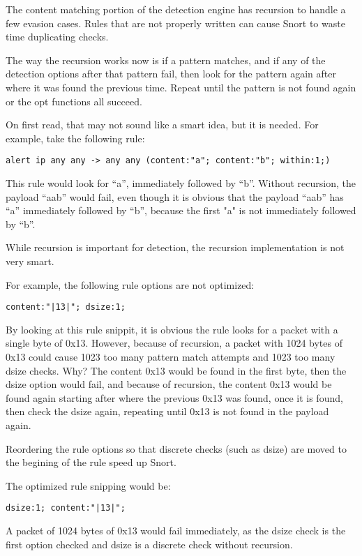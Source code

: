 \documentclass[english]{report}
\begin{document}
The content matching portion of the detection engine has recursion to handle a
few evasion cases.  Rules that are not properly written can cause Snort to
waste time duplicating checks.

The way the recursion works now is if a pattern matches, and if any of the
detection options after that pattern fail, then look for the pattern again
after where it was found the previous time.  Repeat until the pattern is not
found again or the opt functions all succeed.

On first read, that may not sound like a smart idea, but it is needed.  For example, take the following rule:

\begin{verbatim}
alert ip any any -> any any (content:"a"; content:"b"; within:1;)
\end{verbatim}

This rule would look for ``a'', immediately followed by ``b''.  Without recursion,
the payload ``aab'' would fail, even though it is obvious that the payload ``aab''
has ``a'' immediately followed by ``b'', because the first "a" is not
immediately followed by ``b''.

While recursion is important for detection, the recursion implementation is not
very smart.

For example, the following rule options are not optimized:
\begin{verbatim}
content:"|13|"; dsize:1;
\end{verbatim}

By looking at this rule snippit, it is obvious the rule looks for a packet with
a single byte of 0x13.  However, because of recursion, a packet with 1024 bytes
of 0x13 could cause 1023 too many pattern match attempts and 1023 too many
dsize checks.  Why?  The content 0x13 would be found in the first byte, then
the dsize option would fail, and because of recursion, the content 0x13 would
be found again starting after where the previous 0x13 was found, once it is
found, then check the dsize again, repeating until 0x13 is not found in the
payload again.

Reordering the rule options so that discrete checks (such as dsize) are moved to the begining of the rule speed up Snort.  

The optimized rule snipping would be:
\begin{verbatim}
dsize:1; content:"|13|";
\end{verbatim}

A packet of 1024 bytes of 0x13 would fail immediately, as the dsize check is
the first option checked and dsize is a discrete check without recursion.
\end{document}
